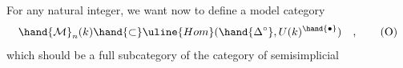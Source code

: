 For any natural integer, we want now to define a model category
\[ \hand{\mathcal{M}}_n(k) \hand{\subset} \uline{Hom}(\hand{\Delta^{\circ}}, U(k)^\hand{\bullet}) \quad , \tag{O} \]
which should be a full subcategory of the category of semisimplicial



